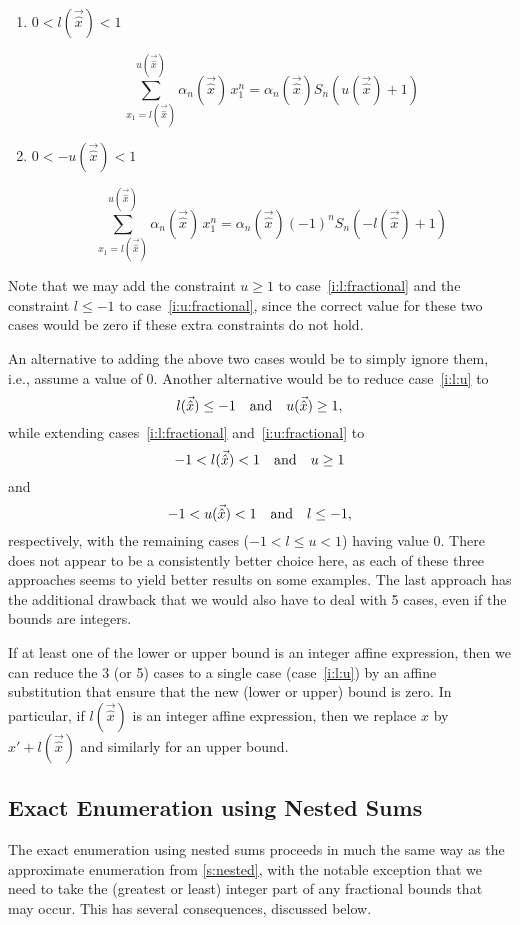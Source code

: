 \begin{enumerate}
\setcounter{enumi}{\value{saveenumi}}
\item $0 < l(\vec {\hat x}) < 1$
\label{i:l:fractional}

$$
\sum_{x_1 = l(\vec {\hat x})}^{u(\vec{\hat x})} \alpha_n(\vec{\hat x}) \, x_1^n
=
\alpha_n(\vec{\hat x})
S_n(u(\vec{\hat x})+1)
$$

\item $0 < -u(\vec {\hat x}) < 1$
\label{i:u:fractional}

$$
\sum_{x_1 = l(\vec {\hat x})}^{u(\vec{\hat x})} \alpha_n(\vec{\hat x}) \, x_1^n
=
\alpha_n(\vec{\hat x})
(-1)^n
S_n(-l(\vec{\hat x})+1)
$$

\end{enumerate}
Note that we may add the constraint $u \ge 1$ to
case~\ref{i:l:fractional} and the constraint $l \le -1$
to case~\ref{i:u:fractional}, since the correct value for
these two cases would be zero if these extra constraints do not hold.

An alternative to adding the above two cases would be
to simply ignore them, i.e., assume a value of $0$.
Another alternative would be to reduce case~\ref{i:l:u}
to
$$
l(\vec {\hat x}) \le -1\quad\hbox{and}\quad u(\vec{\hat x}) \ge 1
,
$$
while extending cases~\ref{i:l:fractional} and~\ref{i:u:fractional}
to
$$
-1 < l(\vec {\hat x}) < 1\quad\hbox{and}\quad u \ge 1
$$
and
$$
-1 < u(\vec {\hat x}) < 1\quad\hbox{and}\quad l \le -1
,
$$
respectively, with the remaining cases
($-1 < l \le u < 1$) having value $0$.
There does not appear to be a consistently better choice
here, as each of these three approaches seems to yield better
results on some examples.
The last approach has the additional drawback that we
would also have to deal with 5 cases, even if the bounds
are integers.

If at least one of the lower or upper bound is an
integer affine expression, then we can reduce
the 3 (or 5) cases to a single case (case~\ref{i:l:u})
by an affine substitution that ensure that the
new (lower or upper) bound is zero.
In particular, if $l(\vec {\hat x})$ is an integer affine
expression, then we replace $x$ by $x' + l(\vec {\hat x})$
and similarly for an upper bound.

\subsection{Exact Enumeration using Nested Sums}
\label{s:nested:exact}

The exact enumeration using nested sums proceeds in much
the same way as the approximate enumeration from
\autoref{s:nested}, with the notable exception
that we need to take the (greatest or least) integer part
of any fractional bounds that may occur.
This has several consequences, discussed below.

